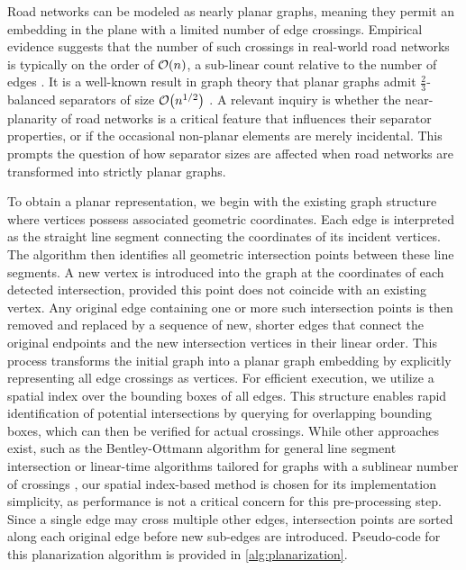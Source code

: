 Road networks can be modeled as nearly planar graphs, meaning they permit an embedding in the plane with a limited number of edge crossings.
Empirical evidence suggests that the number of such crossings in real-world road networks is typically on the order of \(\mathcal{O}\!\left(n\right)\), a sub-linear count relative to the number of edges \cite{eppstein_studying_2008}.
It is a well-known result in graph theory that planar graphs admit \(\frac{2}{3}\)-balanced separators of size \(\mathcal{O}\!\left(n^{1/2}\right)\) \cite{lipton_separator_1979}.
A relevant inquiry is whether the near-planarity of road networks is a critical feature that influences their separator properties, or if the occasional non-planar elements are merely incidental.
This prompts the question of how separator sizes are affected when road networks are transformed into strictly planar graphs.

To obtain a planar representation, we begin with the existing graph structure where vertices possess associated geometric coordinates.
Each edge is interpreted as the straight line segment connecting the coordinates of its incident vertices.
The algorithm then identifies all geometric intersection points between these line segments.
A new vertex is introduced into the graph at the coordinates of each detected intersection, provided this point does not coincide with an existing vertex.
Any original edge containing one or more such intersection points is then removed and replaced by a sequence of new, shorter edges that connect the original endpoints and the new intersection vertices in their linear order.
This process transforms the initial graph into a planar graph embedding by explicitly representing all edge crossings as vertices.
For efficient execution, we utilize a spatial index over the bounding boxes of all edges.
This structure enables rapid identification of potential intersections by querying for overlapping bounding boxes, which can then be verified for actual crossings.
While other approaches exist, such as the Bentley-Ottmann algorithm for general line segment intersection \cite{bentley_algorithms_1979} or linear-time algorithms tailored for graphs with a sublinear number of crossings \cite{eppstein_linear-time_2010}, our spatial index-based method is chosen for its implementation simplicity, as performance is not a critical concern for this pre-processing step.
Since a single edge may cross multiple other edges, intersection points are sorted along each original edge before new sub-edges are introduced.
Pseudo-code for this planarization algorithm is provided in \cref{alg:planarization}.

